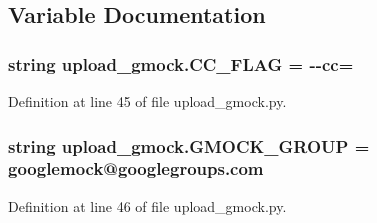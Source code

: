 \subsection{Variable Documentation}
\subsubsection[{\texorpdfstring{C\+C\+\_\+\+F\+L\+AG}{CC_FLAG}}]{\setlength{\rightskip}{0pt plus 5cm}string upload\+\_\+gmock.\+C\+C\+\_\+\+F\+L\+AG = \textquotesingle{}-\/-\/{\bf cc}=\textquotesingle{}}\hypertarget{namespaceupload__gmock_a463de67b37725c16ba31c5d4702e15b8}{}\label{namespaceupload__gmock_a463de67b37725c16ba31c5d4702e15b8}


Definition at line 45 of file upload\+\_\+gmock.\+py.

\subsubsection[{\texorpdfstring{G\+M\+O\+C\+K\+\_\+\+G\+R\+O\+UP}{GMOCK_GROUP}}]{\setlength{\rightskip}{0pt plus 5cm}string upload\+\_\+gmock.\+G\+M\+O\+C\+K\+\_\+\+G\+R\+O\+UP = \textquotesingle{}googlemock@googlegroups.\+com\textquotesingle{}}\hypertarget{namespaceupload__gmock_acf8fe60647d8c3748b0e22dcf669efee}{}\label{namespaceupload__gmock_acf8fe60647d8c3748b0e22dcf669efee}


Definition at line 46 of file upload\+\_\+gmock.\+py.

